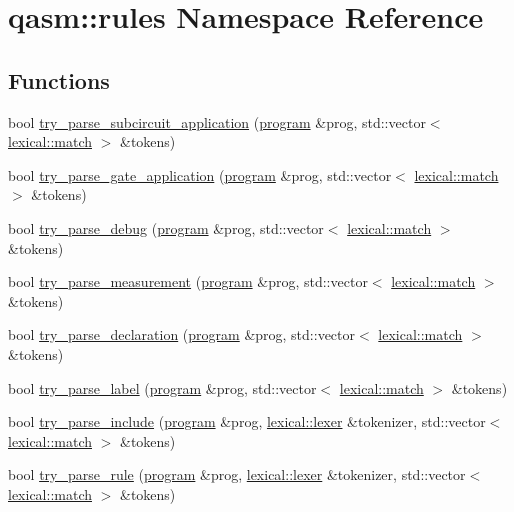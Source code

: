 \hypertarget{namespaceqasm_1_1rules}{}\section{qasm\+:\+:rules Namespace Reference}
\label{namespaceqasm_1_1rules}
\subsection*{Functions}
\begin{DoxyCompactItemize}
\item 
bool \hyperlink{namespaceqasm_1_1rules_a26247b01755121860f87e5a26d9bd391}{try\+\_\+parse\+\_\+subcircuit\+\_\+application} (\hyperlink{classprogram}{program} \&prog, std\+::vector$<$ \hyperlink{structlexical_1_1match}{lexical\+::match} $>$ \&tokens)
\item 
bool \hyperlink{namespaceqasm_1_1rules_aa583e7fb674ce302c13e04802c0ac371}{try\+\_\+parse\+\_\+gate\+\_\+application} (\hyperlink{classprogram}{program} \&prog, std\+::vector$<$ \hyperlink{structlexical_1_1match}{lexical\+::match} $>$ \&tokens)
\item 
bool \hyperlink{namespaceqasm_1_1rules_abe4777fa00a61066da5591048a9cbf54}{try\+\_\+parse\+\_\+debug} (\hyperlink{classprogram}{program} \&prog, std\+::vector$<$ \hyperlink{structlexical_1_1match}{lexical\+::match} $>$ \&tokens)
\item 
bool \hyperlink{namespaceqasm_1_1rules_a5da8b5fa16a6eec3576f64c509a43ffd}{try\+\_\+parse\+\_\+measurement} (\hyperlink{classprogram}{program} \&prog, std\+::vector$<$ \hyperlink{structlexical_1_1match}{lexical\+::match} $>$ \&tokens)
\item 
bool \hyperlink{namespaceqasm_1_1rules_a1e0101b23fdb03759ca22f831662a88b}{try\+\_\+parse\+\_\+declaration} (\hyperlink{classprogram}{program} \&prog, std\+::vector$<$ \hyperlink{structlexical_1_1match}{lexical\+::match} $>$ \&tokens)
\item 
bool \hyperlink{namespaceqasm_1_1rules_ac9cd78216b8e48a2d5aa625d99240cb9}{try\+\_\+parse\+\_\+label} (\hyperlink{classprogram}{program} \&prog, std\+::vector$<$ \hyperlink{structlexical_1_1match}{lexical\+::match} $>$ \&tokens)
\item 
bool \hyperlink{namespaceqasm_1_1rules_abe391ee7a042e770f440498767f889ba}{try\+\_\+parse\+\_\+include} (\hyperlink{classprogram}{program} \&prog, \hyperlink{classlexical_1_1lexer}{lexical\+::lexer} \&tokenizer, std\+::vector$<$ \hyperlink{structlexical_1_1match}{lexical\+::match} $>$ \&tokens)
\item 
bool \hyperlink{namespaceqasm_1_1rules_af40aa89c9f5235a7d2e94af2de62a42b}{try\+\_\+parse\+\_\+rule} (\hyperlink{classprogram}{program} \&prog, \hyperlink{classlexical_1_1lexer}{lexical\+::lexer} \&tokenizer, std\+::vector$<$ \hyperlink{structlexical_1_1match}{lexical\+::match} $>$ \&tokens)
\end{DoxyCompactItemize}


